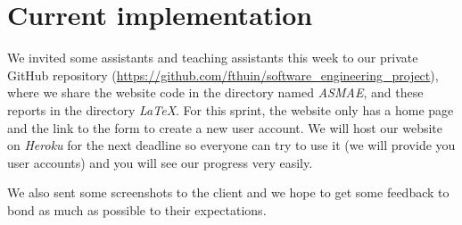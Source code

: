 
\section{Current implementation}

We invited some assistants and teaching assistants this week to our private GitHub repository
(\url{https://github.com/fthuin/software_engineering_project}), where we
share the website code in the directory named \textit{ASMAE}, and these reports in the
directory \textit{LaTeX}. For this sprint, the website only has a home page
and the link to the form to create a new user account. We will host
our website on \textit{Heroku} for the next deadline so everyone can try to
use it (we will provide you user accounts) and you will see our progress
very easily. \newline

We also sent some screenshots to the client and we hope to get some
feedback to bond as much as possible to their expectations. \newline
